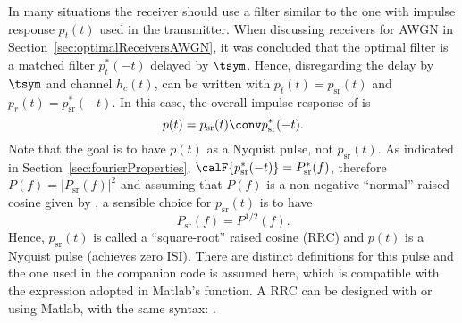 In many situations the receiver should use a filter similar to the one with impulse response $p_t(t)$ used in the transmitter. When discussing receivers for AWGN in Section~\ref{sec:optimalReceiversAWGN}, it was concluded that the optimal filter is a matched filter $p_t^*(-t)$ delayed by $\tsym$. Hence, disregarding the delay by $\tsym$ and channel $h_c(t)$,  can be written with $p_t(t)=p_{\textrm{sr}}(t)$ and $p_r(t)=p_{\textrm{sr}}^*(-t)$. In this case, the overall impulse response of  is 
\begin{equation}
p(t) = p_{\textrm{sr}}(t) \conv p_{\textrm{sr}}^*(-t).
\label{eq:timeDomainSquareRootRaisedCosine}
\end{equation}
Note that the goal is to have $p(t)$ as a Nyquist pulse, not $p_{\textrm{sr}}(t)$. As indicated in Section~\ref{sec:fourierProperties}, $\calF \{ p_{\textrm{sr}}^*(-t) \} = P_{\textrm{sr}}^*(f)$, therefore $P(f)=|P_{\textrm{sr}}(f)|^2$ and assuming that $P(f)$ is a non-negative ``normal'' raised cosine given by , a sensible choice for $p_{\textrm{sr}}(t)$ is to have
\begin{equation}
P_{\textrm{sr}}(f) = P^{1/2}(f).
\label{eq:squareRootRaisedCosine}
\end{equation}
Hence, $p_{\textrm{sr}}(t)$ is called a ``square-root'' raised cosine (RRC) and $p(t)$ is a Nyquist pulse (achieves zero ISI). There are distinct definitions for this pulse and the one used in the companion code  is assumed here, which is compatible with the expression adopted in Matlab's  function. A RRC can be designed with  or using Matlab, with the same syntax: .


